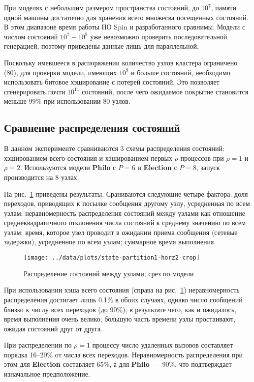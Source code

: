 \documentclass[12pt,a4paper,fleqn]{article}
\newcommand{\Code}[1]{\textbf{\mbox{#1}}}
\begin{document}
При моделях с небольшим размером пространства состояний, до $10^7$, памяти одной машины
достаточно для хранения всего множесва посещенных состояний. В этом диапазоне время работы
ПО Spin и разработанного сравнимы. Модели с числом состояний $10^7-10^8$ уже невозможно
проверить последовательной генерацией, поэтому приведены данные лишь для
параллельной. 

Поскольку имевшееся в распоряжении количество узлов кластера ограничено (80), для проверки
модели, имеющих $10^9$ и больше состояний, необходимо использовать битовое хэширование с
потерей состояний. Это позволяет сгенерировать почти $10^{11}$ состояний, после чего
ожидаемое покрытие становится меньше 99\% при использовании 80 узлов.

\subsection{Сравнение распределения состояний}

В данном эксперименте сравниваются 3 схемы распределения состояний: хэшированием всего состояния и
хэшированием первых $\rho$ процессов при $\rho = 1$ и $\rho = 2$. Используются модели \Code{Philo} с
$P = 6$ и \Code{Election} с $P = 8$, запуск производится на 8 узлах.

На рис.~\ref{fig:state-partition1} приведены результаты. Сраниваются следующие четыре
фактора: доля переходов, приводящих к посылке сообщения другому узлу, усредненная по всем
узлам; неравномерность распределения состояний между узлами как отношение
среднеквадратичного отклонения числа состояний к среднему значению по всем узлам; время,
которое узел проводит в ожидании приема сообщения (сетевые задержки), усредненное по всем
узлам; суммарное время выполнения.

\begin{figure}[htb]
  \centering
  \texttt{[image: ../data/plots/state-partition1-horz2-crop]}
  \caption{Распределение состояний между узлами; срез по модели}
  \label{fig:state-partition1}
\end{figure}

При использовании хэша всего состояния (справа на рис.~\ref{fig:state-partition1}) неравномерность
распределения достигает лишь 0.1\% в обоих случаях, однако число сообщений близко к числу всех
переходов (до 90\%), в результате чего, как и ожидалось, время выполнения очень велико; большую
часть времени узлы простаивают, ожидая состояний друг от друга.

При распределении по $\rho = 1$ процессу число удаленных вызовов составляет порядка
16--20\% от числа всех переходов. Неравномерность распределения при этом для
\Code{Election} составляет 65\%, а для \Code{Philo}~--- 90\%, что подтверждает изначальное
предположение.
\end{document}

